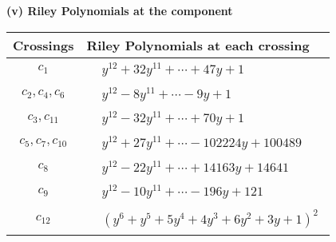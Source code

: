 \documentclass[1p]{elsarticle_modified}
\theoremstyle{definition}
\begin{document}
\newpage\renewcommand{\arraystretch}{1}
\flushleft \textbf{(v) Riley Polynomials at the component}\newline \\
\begin{tabular}{m{50pt}|m{274pt}}
Crossings & \hspace{64pt}Riley Polynomials at each crossing \\
\hline $$\begin{aligned}c_{1}\end{aligned}$$&$\begin{aligned}
&y^{12}+32 y^{11}+\cdots+47 y+1
\end{aligned}$\\
\hline $$\begin{aligned}c_{2},c_{4},c_{6}\end{aligned}$$&$\begin{aligned}
&y^{12}-8 y^{11}+\cdots-9 y+1
\end{aligned}$\\
\hline $$\begin{aligned}c_{3},c_{11}\end{aligned}$$&$\begin{aligned}
&y^{12}-32 y^{11}+\cdots+70 y+1
\end{aligned}$\\
\hline $$\begin{aligned}c_{5},c_{7},c_{10}\end{aligned}$$&$\begin{aligned}
&y^{12}+27 y^{11}+\cdots-102224 y+100489
\end{aligned}$\\
\hline $$\begin{aligned}c_{8}\end{aligned}$$&$\begin{aligned}
&y^{12}-22 y^{11}+\cdots+14163 y+14641
\end{aligned}$\\
\hline $$\begin{aligned}c_{9}\end{aligned}$$&$\begin{aligned}
&y^{12}-10 y^{11}+\cdots-196 y+121
\end{aligned}$\\
\hline $$\begin{aligned}c_{12}\end{aligned}$$&$\begin{aligned}
&(y^6+y^5+5 y^4+4 y^3+6 y^2+3 y+1)^2
\end{aligned}$\\
\hline
\end{tabular}\\~\\
\end{document}
